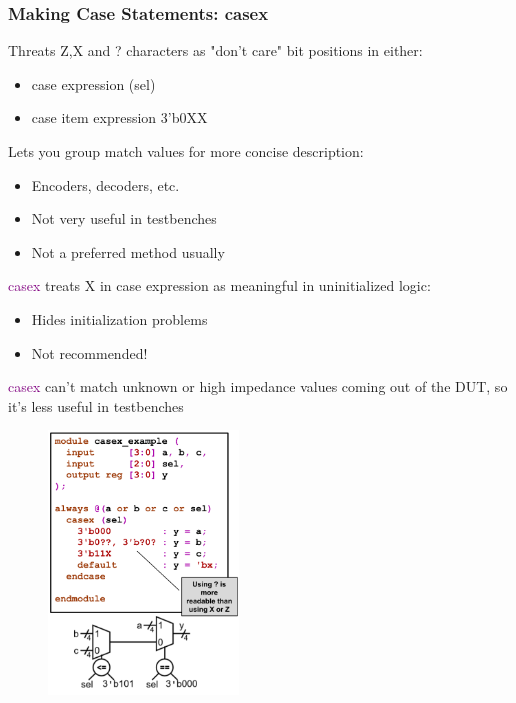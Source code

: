 \documentclass[t, notes, xcolor=table]{beamer}
\begin{document}
\begin{frame}
\frametitle{Making Case Statements: casex}
\tiny{
\begin{multicols}{2}
Threats Z,X and ? characters as "don't care" bit positions in either:
\begin{itemize}
\item case expression (sel)
\item case item expression 3'b0XX
\end{itemize}
Lets you group match values for more concise description:
\begin{itemize}
\item Encoders, decoders, etc.
\item Not very useful in testbenches
\item Not a preferred method usually
\end{itemize}

\textcolor{purple}{casex} treats X in case expression as meaningful in uninitialized logic:
\begin{itemize}
\item Hides initialization problems
\item Not recommended!
\end{itemize}
\textcolor{purple}{casex} can't match unknown or high impedance values coming out of the DUT, so it's less useful in testbenches
\vfill
\columnbreak
\begin{figure}
    \includegraphics[width=0.45\textwidth]{img/06_casex.png}
\end{figure}
\end{multicols}
}
\end{frame}
\end{document}
